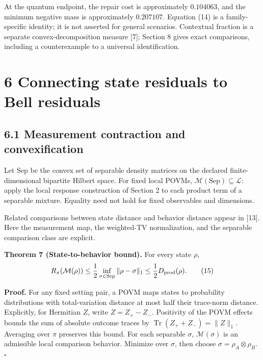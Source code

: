 \documentclass[
]{article}
\begin{document}
At the quantum endpoint, the repair cost is approximately \(0.104063\), and the minimum negative mass is approximately \(0.207107\). Equation (14) is a family-specific identity; it is not asserted for general scenarios. Contextual fraction is a separate convex-decomposition measure {[}7{]}; Section 8 gives exact comparisons, including a counterexample to a universal identification.

\section{6 Connecting state residuals to Bell residuals}\label{connecting-state-residuals-to-bell-residuals}

\subsection{6.1 Measurement contraction and convexification}\label{measurement-contraction-and-convexification}

Let \(\mathrm{Sep}\) be the convex set of separable density matrices on the declared finite-dimensional bipartite Hilbert space. For fixed local POVMs, \(\mathcal M(\mathrm{Sep})\subseteq\mathcal L\): apply the local response construction of Section 2 to each product term of a separable mixture. Equality need not hold for fixed observables and dimensions.

Related comparisons between state distance and behavior distance appear in {[}13{]}. Here the measurement map, the weighted-TV normalization, and the separable comparison class are explicit.

\textbf{Theorem 7 (State-to-behavior bound).} For every state \(\rho\),
\[
R_\pi(\mathcal M(\rho))
\le\frac12\inf_{\sigma\in\mathrm{Sep}}\|\rho-\sigma\|_1
\le\frac12D_{\rm prod}(\rho).
\tag{15}
\]

\textbf{Proof.} For any fixed setting pair, a POVM maps states to probability distributions with total-variation distance at most half their trace-norm distance. Explicitly, for Hermitian \(Z\), write \(Z=Z_+-Z_-\). Positivity of the POVM effects bounds the sum of absolute outcome traces by \(\operatorname{Tr}(Z_++Z_-)=\|Z\|_1\). Averaging over \(\pi\) preserves this bound. For each separable \(\sigma\), \(\mathcal M(\sigma)\) is an admissible local comparison behavior. Minimize over \(\sigma\), then choose \(\sigma=\rho_A\otimes\rho_B\). \(\square\)
\end{document}
